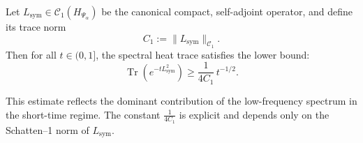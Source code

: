 \begin{lemma}
\label{lem:hk-lower-bound}
Let \( L_{\mathrm{sym}} \in \mathcal{C}_1(H_{\Psi_\alpha}) \) be the canonical compact, self-adjoint operator, and define its trace norm
\[
C_1 := \| L_{\mathrm{sym}} \|_{\mathcal{C}_1}.
\]
Then for all \( t \in (0,1] \), the spectral heat trace satisfies the lower bound:
\[
\operatorname{Tr}\left( e^{-t L_{\mathrm{sym}}^2} \right) \ge \frac{1}{4C_1} \, t^{-1/2}.
\]

\medskip
\noindent
This estimate reflects the dominant contribution of the low-frequency spectrum in the short-time regime. The constant \( \frac{1}{4C_1} \) is explicit and depends only on the Schatten–1 norm of \( L_{\mathrm{sym}} \).
\end{lemma}
